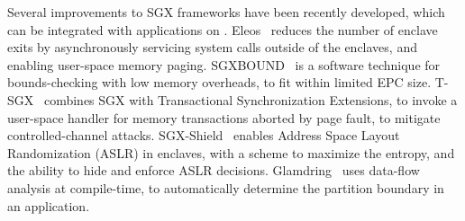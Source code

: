 

Several improvements to SGX frameworks have been recently developed, 
which can
be integrated with applications on \graphenesgx{}.
Eleos~\cite{orenbach17eleos} reduces the number of enclave exits
by asynchronously servicing system calls outside of the enclaves, and enabling user-space memory paging.
SGXBOUND~\cite{kuvaiskii17sgxbound} is a software technique for bounds-checking with low memory overheads,
to fit within limited EPC size.
T-SGX~\cite{shih2017t-sgx} combines SGX with Transactional Synchronization Extensions, to invoke a user-space handler for memory transactions aborted by page fault, to mitigate controlled-channel attacks.
SGX-Shield~\cite{seo2017sgx-shield} enables Address Space Layout Randomization (ASLR) in enclaves, with a scheme to maximize the entropy, and the ability to hide and enforce ASLR decisions.
Glamdring~\cite{glamdring} uses data-flow analysis at compile-time, to automatically determine the partition boundary in an application.


